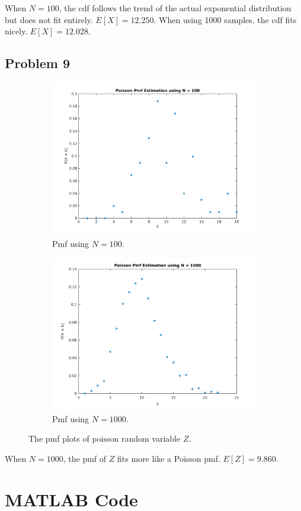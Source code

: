 \documentclass{article}
\begin{document}
		When $N = 100$, the cdf follows the trend of the actual exponential
		distribution but does not fit entirely. $E[X] = 12.250$. When using 1000
		samples, the cdf fits nicely. $E[X] = 12.028$.
	\subsection*{Problem 9}
		\begin{figure}[!hbt]
			\centering
			\begin{subfigure}[!hbt]{0.45\linewidth}
				\centering
				\includegraphics[width=1\linewidth]{hw2_9_poi_pmf_n100.png}
				\caption{Pmf using $N = 100$.}
			\end{subfigure}
			\begin{subfigure}[!hbt]{0.45\linewidth}
				\centering
				\includegraphics[width=1\linewidth]{hw2_9_poi_pmf_n1000.png}
				\caption{Pmf using $N = 1000$.}
			\end{subfigure}
			\caption{The pmf plots of poisson random variable $Z$.}
		\end{figure}
		When $N = 1000$, the pmf of $Z$ fits more like a Poisson pmf. $E[Z] = 9.860$.

\section*{MATLAB Code}
		\inputminted[tabsize=2,breaklines]{matlab}{hw2.m}
\end{document}
